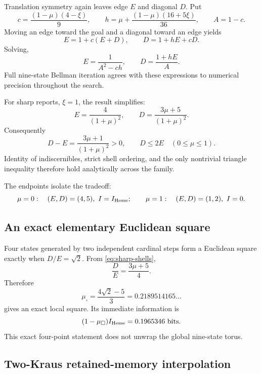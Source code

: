 \documentclass[11pt]{article}
\theoremstyle{definition}
\theoremstyle{remark}
\begin{document}
Translation symmetry again leaves edge \(E\) and diagonal \(D\). Put
\[
c=\frac{(1-\mu)(4-\xi)}9,\qquad
h=\mu+\frac{(1-\mu)(16+5\xi)}{36},\qquad
A=1-c.
\]
Moving an edge toward the goal and a diagonal toward an edge yields
\begin{equation}
E=1+c(E+D),\qquad
D=1+hE+cD.
\label{eq:general-bellman}
\end{equation}
Solving,
\begin{equation}
\boxed{E=\frac1{A^2-ch}},\qquad
\boxed{D=\frac{1+hE}{A}}.
\label{eq:general-shells}
\end{equation}
Full nine-state Bellman iteration agrees with these expressions to numerical
precision throughout the search.

For sharp reports, \(\xi=1\), the result simplifies:
\begin{equation}
\boxed{E=\frac4{(1+\mu)^2}},\qquad
\boxed{D=\frac{3\mu+5}{(1+\mu)^2}}.
\label{eq:sharp-shells}
\end{equation}
Consequently
\[
D-E=\frac{3\mu+1}{(1+\mu)^2}>0,\qquad
D\le2E\quad(0\le\mu\le1).
\]
Identity of indiscernibles, strict shell ordering, and the only nontrivial
triangle inequality therefore hold analytically across the family.

The endpoints isolate the tradeoff:
\[
\mu=0:\quad (E,D)=(4,5),\ I=I_{\rm Hesse};
\qquad
\mu=1:\quad (E,D)=(1,2),\ I=0.
\]

\subsection{An exact elementary Euclidean square}

Four states generated by two independent cardinal steps form a Euclidean
square exactly when \(D/E=\sqrt2\). From \cref{eq:sharp-shells},
\[
\frac DE=\frac{3\mu+5}{4}.
\]
Therefore
\begin{equation}
\boxed{\mu_\square=\frac{4\sqrt2-5}{3}
=0.2189514165\ldots}
\label{eq:musquare}
\end{equation}
gives an exact local square. Its immediate information is
\[
(1-\mu_\square)I_{\rm Hesse}=0.1965346\ {\rm bits}.
\]
This exact four-point statement does not unwrap the global nine-state torus.

\subsection{Two-Kraus retained-memory interpolation}
\label{sec:twokraus}
\end{document}
